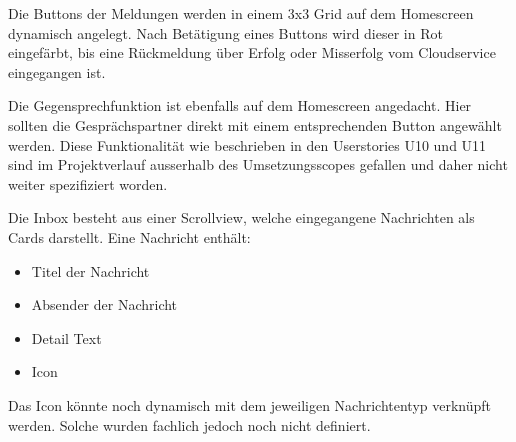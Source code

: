 Die Buttons der Meldungen werden in einem 3x3 Grid auf dem Homescreen dynamisch angelegt.
Nach Betätigung eines Buttons wird dieser in Rot eingefärbt, bis eine Rückmeldung über Erfolg oder Misserfolg vom Cloudservice eingegangen ist.

Die Gegensprechfunktion ist ebenfalls auf dem Homescreen angedacht.
Hier sollten die Gesprächspartner direkt mit einem entsprechenden Button angewählt werden.
Diese Funktionalität wie beschrieben in den Userstories U10 und U11 sind im Projektverlauf ausserhalb des Umsetzungsscopes gefallen und daher nicht weiter spezifiziert worden.

Die Inbox besteht aus einer Scrollview, welche eingegangene Nachrichten als Cards darstellt.
Eine Nachricht enthält:
\begin{itemize}
    \item Titel der Nachricht
    \item Absender der Nachricht
    \item Detail Text
    \item Icon
\end{itemize}

Das Icon könnte noch dynamisch mit dem jeweiligen Nachrichtentyp verknüpft werden.
Solche wurden fachlich jedoch noch nicht definiert.

\clearpage